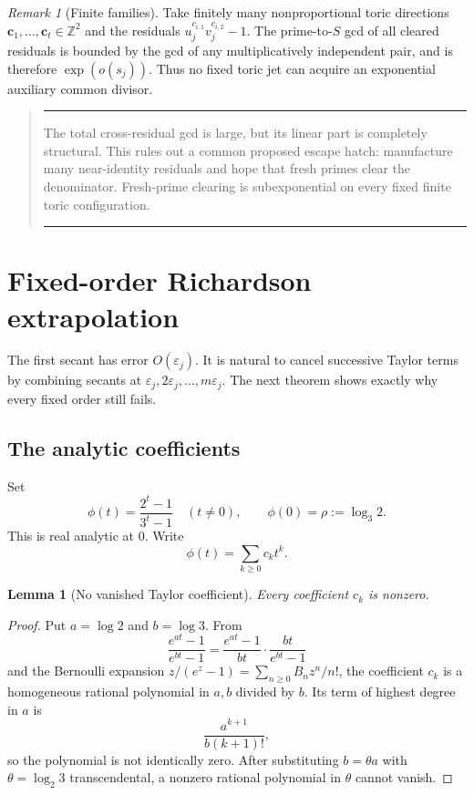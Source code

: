 \documentclass[11pt,oneside]{article}
\newtheorem{lemma}[theorem]{Lemma}
\theoremstyle{definition}
\theoremstyle{remark}
\newtheorem{remark}[theorem]{Remark}
\newcommand{\Z}{\mathbb Z}
\newcommand{\eps}{\varepsilon}
\newenvironment{resultbox}
 {\begin{quote}\hrule\smallskip\noindent}
 {\par\smallskip\hrule\end{quote}}
\begin{document}
\begin{remark}[Finite families]
Take finitely many nonproportional toric directions
$\mathbf c_1,\ldots,\mathbf c_t\in\Z^2$ and the residuals
$u_j^{c_{i,1}}v_j^{c_{i,2}}-1$.  The prime-to-$S$ gcd of all cleared residuals is bounded by
the gcd of any multiplicatively independent pair, and is therefore $\exp(o(s_j))$.  Thus no
fixed toric jet can acquire an exponential auxiliary common divisor.
\end{remark}

\begin{resultbox}
The total cross-residual gcd is large, but its linear part is completely structural.  This
rules out a common proposed escape hatch: manufacture many near-identity residuals and hope
that fresh primes clear the denominator.  Fresh-prime clearing is subexponential on every
fixed finite toric configuration.
\end{resultbox}

\section{Fixed-order Richardson extrapolation}
\label{sec:richardson}

The first secant has error $O(\eps_j)$.  It is natural to cancel successive Taylor terms by
combining secants at $\eps_j,2\eps_j,\ldots,m\eps_j$.  The next theorem shows exactly why every
fixed order still fails.

\subsection{The analytic coefficients}

Set
\begin{equation}
 \phi(t)=\frac{2^t-1}{3^t-1}
 \quad(t\ne0),
 \qquad
 \phi(0)=\rho:=\log_3 2.
 \label{eq:phi}
\end{equation}
This is real analytic at $0$.  Write
\begin{equation}
 \phi(t)=\sum_{k\ge0}c_kt^k.
 \label{eq:phi-series}
\end{equation}

\begin{lemma}[No vanished Taylor coefficient]
\label{lem:ck-nonzero}
Every coefficient $c_k$ is nonzero.
\end{lemma}

\begin{proof}
Put $a=\log2$ and $b=\log3$.  From
\[
 \frac{e^{at}-1}{e^{bt}-1}
 =\frac{e^{at}-1}{bt}\cdot\frac{bt}{e^{bt}-1}
\]
and the Bernoulli expansion $z/(e^z-1)=\sum_{n\ge0}B_nz^n/n!$, the coefficient $c_k$ is a
homogeneous rational polynomial in $a,b$ divided by $b$.  Its term of highest degree in $a$
is
\[
 \frac{a^{k+1}}{b(k+1)!},
\]
so the polynomial is not identically zero.  After substituting $b=\theta a$ with
$\theta=\log_2 3$ transcendental, a nonzero rational polynomial in $\theta$ cannot vanish.
\end{proof}
\end{document}
